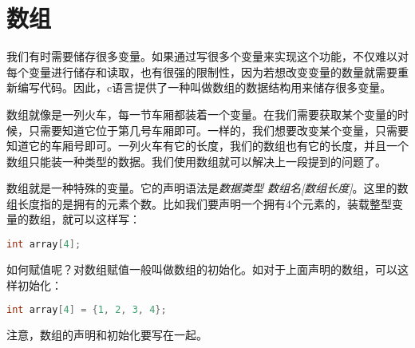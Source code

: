 \section{数组}

我们有时需要储存很多变量。如果通过写很多个变量来实现这个功能，不仅难以对每个变量进行储存和读取，也有很强的限制性，因为若想改变变量的数量就需要重新编写代码。因此，c语言提供了一种叫做数组的数据结构用来储存很多变量。

数组就像是一列火车，每一节车厢都装着一个变量。在我们需要获取某个变量的时候，只需要知道它位于第几号车厢即可。一样的，我们想要改变某个变量，只需要知道它的车厢号即可。一列火车有它的长度，我们的数组也有它的长度，并且一个数组只能装一种类型的数据。我们使用数组就可以解决上一段提到的问题了。

数组就是一种特殊的变量。它的声明语法是\textit{数据类型 数组名[数组长度]}。这里的数组长度指的是拥有的元素个数。比如我们要声明一个拥有4个元素的，装载整型变量的数组，就可以这样写：

\begin{lstlisting}[language=C]
    int array[4];
\end{lstlisting}

如何赋值呢？对数组赋值一般叫做数组的初始化。如对于上面声明的数组，可以这样初始化：

\begin{lstlisting}[language=C]
    int array[4] = {1, 2, 3, 4};
\end{lstlisting}

注意，数组的声明和初始化要写在一起。
